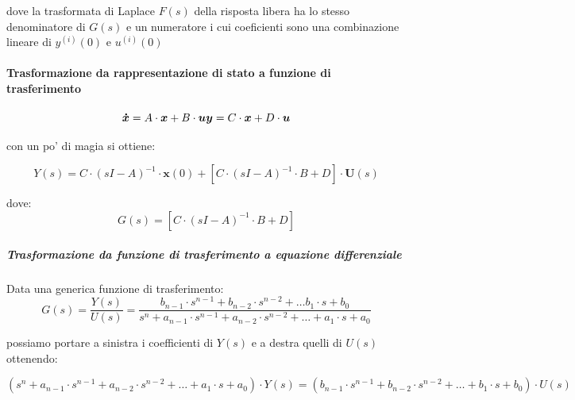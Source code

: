 \documentclass[11pt]{article}
\begin{document}
dove la trasformata di Laplace \(F(s)\) della risposta libera ha lo
stesso denominatore di \(G(s)\) e un numeratore i cui coeficienti sono
una combinazione lineare di \(y^{(i)}(0)\) e \(u^{(i)}(0)\)

    \hypertarget{trasformazione-da-rappresentazione-di-stato-a-funzione-di-trasferimento}{%
\paragraph{Trasformazione da rappresentazione di stato a funzione di
trasferimento}\label{trasformazione-da-rappresentazione-di-stato-a-funzione-di-trasferimento}}

\begin{equation}
    \boldsymbol{\dot{x}} = A \cdot \boldsymbol{x} + B \cdot \boldsymbol{u}\\
    \boldsymbol{y} = C \cdot \boldsymbol{x} + D \cdot \boldsymbol{u}
\end{equation}

    con un po' di magia si ottiene:

\begin{equation}
    Y(s) = C \cdot (sI - A)^{-1} \cdot \boldsymbol{x}(0) + [ C \cdot (sI - A)^{-1} \cdot B + D] \cdot \boldsymbol{U}(s)
\end{equation}

    dove:\\
\begin{equation}
G(s) = [C \cdot (sI - A)^{-1} \cdot B + D]
\end{equation}

    \hypertarget{trasformazione-da-funzione-di-trasferimento-a-equazione-differenziale}{%
\subparagraph{Trasformazione da funzione di trasferimento a equazione
differenziale}\label{trasformazione-da-funzione-di-trasferimento-a-equazione-differenziale}}

Data una generica funzione di trasferimento:\\
\begin{equation}
G(s) = \frac{Y(s)}{U(s)} = \frac{b_{n-1} \cdot s^{n-1} + b_{n-2} \cdot s^{n-2} + \dots b_1 \cdot s + b_0}{s^n + a_{n-1} \cdot s^{n-1} + a_{n-2} \cdot s^{n-2} + \dots + a_1 \cdot s + a_0}
\end{equation}

    possiamo portare a sinistra i coefficienti di \(Y(s)\) e a destra quelli
di \(U(s)\) ottenendo:

\begin{equation}
    (s^n + a_{n-1} \cdot s^{n-1} + a_{n-2} \cdot s^{n-2} + \dots + a_1 \cdot s + a_0) \cdot Y(s) =
    (b_{n-1} \cdot s^{n-1} + b_{n-2} \cdot s^{n-2} + \dots + b_1 \cdot s + b_0) \cdot U(s)
\end{equation}
\end{document}
